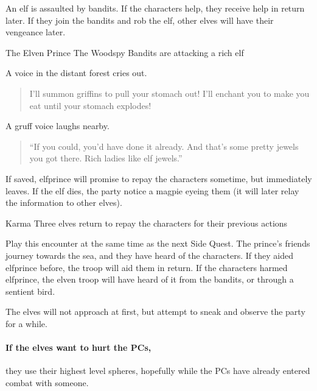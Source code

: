 \label{littleprince}

\noindent
An elf is assaulted by bandits.
If the characters help, they receive help in return later.
If they join the bandits and rob the elf, other elves will have their vengeance later.

{The Elven Prince}%
{The Woodspy Bandits are attacking a rich elf}%

\begin{boxtext}
  A voice in the distant forest cries out.
  \begin{quote}
    I'll summon griffins to pull your stomach out!  I'll enchant you to make you eat until your stomach explodes!
  \end{quote}

  A gruff voice laughs nearby.

  \begin{quote}
    ``If you could, you'd have done it already.  And that's some pretty jewels you got there.  Rich ladies like elf jewels.''
  \end{quote}

\end{boxtext}


\elfprince

If saved, \gls{elfprince} will promise to repay the characters sometime, but immediately leaves.
If the elf dies, the party notice a magpie eyeing them (it will later relay the information to other elves).

{\squash Karma}%
{Three elves return to repay the characters for their previous actions}%

Play this encounter at the same time as the next Side Quest.
The prince's friends journey towards the sea, and they have heard of the characters.
If they aided \gls{elfprince} before, the troop will aid them in return.
If the characters harmed \gls{elfprince}, the elven troop will have heard of it from the bandits, or through a sentient bird.

The elves will not approach at first, but attempt to sneak and observe the party for a while.

\paragraph{If the elves want to hurt the PCs,}
they use their highest level spheres, hopefully while the PCs have already entered combat with someone.

